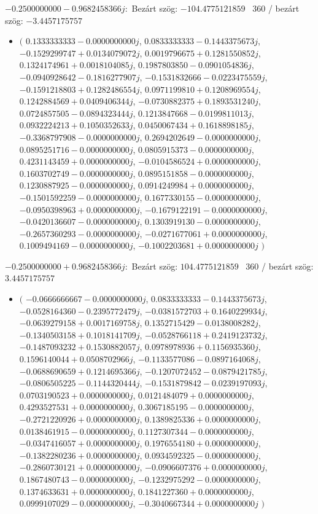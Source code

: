 \documentclass[14pt,a4paper]{article}
\begin{document}
$-0.2500000000-0.9682458366j$:\
Bezárt szög: $-104.4775121859$ \
360 / bezárt szög: $-3.4457175757$\
\begin{itemize}
\item
$\big($
$0.1333333333-0.0000000000j$, $0.0833333333-0.1443375673j$, $-0.1529299747+0.0134079072j$, $0.0019796675+0.1281550852j$, $0.1324174961+0.0018104085j$, $0.1987803850-0.0901054836j$, $-0.0940928642-0.1816277907j$, $-0.1531832666-0.0223475559j$, $-0.1591218803+0.1282486554j$, $0.0971199810+0.1208969554j$, $0.1242884569+0.0409406344j$, $-0.0730882375+0.1893531240j$, $0.0724857505-0.0894323444j$, $0.1213847668-0.0199811013j$, $0.0932224213+0.1050352633j$, $0.0450067434+0.1618898185j$, $-0.3368797908-0.0000000000j$, $0.2694202649-0.0000000000j$, $0.0895251716-0.0000000000j$, $0.0805915373-0.0000000000j$, $0.4231143459+0.0000000000j$, $-0.0104586524+0.0000000000j$, $0.1603702749-0.0000000000j$, $0.0895151858-0.0000000000j$, $0.1230887925-0.0000000000j$, $0.0914249984+0.0000000000j$, $-0.1501592259-0.0000000000j$, $0.1677330155-0.0000000000j$, $-0.0950398963+0.0000000000j$, $-0.1679122191-0.0000000000j$, $-0.0420136607-0.0000000000j$, $0.1303919130-0.0000000000j$, $-0.2657360293-0.0000000000j$, $-0.0271677061+0.0000000000j$, $0.1009494169-0.0000000000j$, $-0.1002203681+0.0000000000j$
$\big)$
\end{itemize}
$-0.2500000000+0.9682458366j$:\
Bezárt szög: $104.4775121859$ \
360 / bezárt szög: $3.4457175757$\
\begin{itemize}
\item
$\big($
$-0.0666666667-0.0000000000j$, $0.0833333333-0.1443375673j$, $-0.0528164360-0.2395772479j$, $-0.0381572703+0.1640229934j$, $-0.0639279158+0.0017169758j$, $0.1352715429-0.0138008282j$, $-0.1340503158+0.1018141709j$, $-0.0528766118+0.2419123732j$, $-0.1487093232+0.1530882057j$, $0.0978978936+0.1156935360j$, $0.1596140044+0.0508702966j$, $-0.1133577086-0.0897164068j$, $-0.0688690659+0.1214695366j$, $-0.1207072452-0.0879421785j$, $-0.0806505225-0.1144320444j$, $-0.1531879842-0.0239197093j$, $0.0703190523+0.0000000000j$, $0.0121484079+0.0000000000j$, $0.4293527531+0.0000000000j$, $0.3067185195-0.0000000000j$, $-0.2721220926+0.0000000000j$, $0.1389825336+0.0000000000j$, $0.0138461915-0.0000000000j$, $0.1127307344-0.0000000000j$, $-0.0347416057+0.0000000000j$, $0.1976554180+0.0000000000j$, $-0.1382280236+0.0000000000j$, $0.0934592325-0.0000000000j$, $-0.2860730121+0.0000000000j$, $-0.0906607376+0.0000000000j$, $0.1867480743-0.0000000000j$, $-0.1232975292-0.0000000000j$, $0.1374633631+0.0000000000j$, $0.1841227360+0.0000000000j$, $0.0999107029-0.0000000000j$, $-0.3040667344+0.0000000000j$
$\big)$
\end{itemize}
\end{document}
